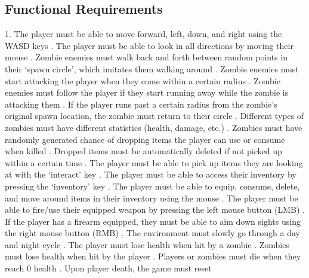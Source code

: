 \documentclass[12pt, titlepage]{article}
\begin{document}

\subsection{Functional Requirements}

1. The player must be able to move forward, left, down, and right using the WASD keys 
. The player must be able to look in all directions by moving their mouse
. Zombie enemies must walk back and forth between random points in their ‘spawn circle’, which imitates them walking around
. Zombie enemies must start attacking the player when they come within a certain radius 
. Zombie enemies must follow the player if they start running away while the zombie is attacking them
. If the player runs past a certain radius from the zombie’s original spawn location, the zombie must return to their circle
. Different types of zombies must have different statistics (health, damage, etc.)
. Zombies must have randomly generated chance of dropping items the player can use or consume when killed
. Dropped items must be automatically deleted if not picked up within a certain time
. The player must be able to pick up items they are looking at with the ‘interact’ key
. The player must be able to access their inventory by pressing the ‘inventory’ key
. The player must be able to equip, consume, delete, and move around items in their inventory using the mouse
. The player must be able to fire/use their equipped weapon by pressing the left mouse button (LMB)
. If the player has a firearm equipped, they must be able to aim down sights using the right mouse button (RMB)
. The environment must slowly go through a day and night cycle
. The player must lose health when hit by a zombie
. Zombies must lose health when hit by the player
. Players or zombies must die when they reach 0 health
. Upon player death, the game must reset 
\end{document}
